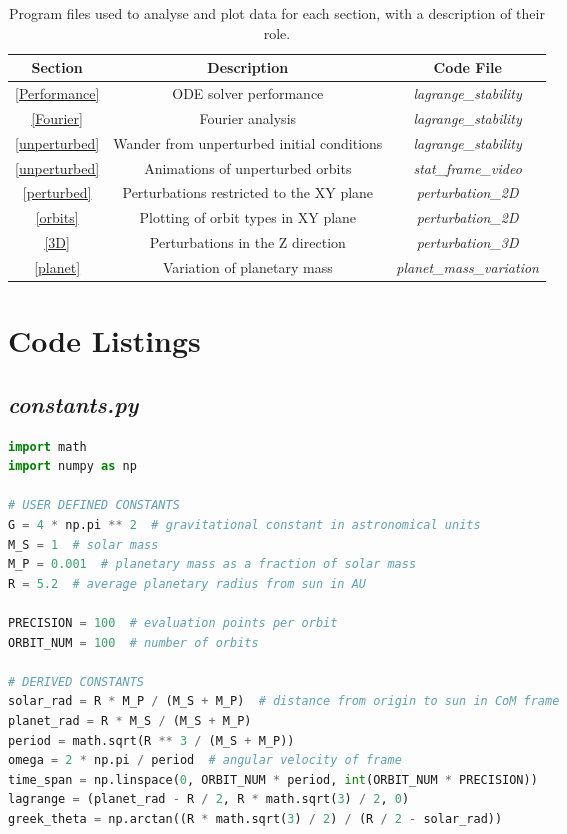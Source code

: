 \documentclass[11pt, a4paper,twocolumn]{article} %
\begin{document}
\begin{appendices}
\begin{table}[ht!]
	\caption{Program files used to analyse and plot data for each section, with a description of their role.}
	\centering
	\begin{tabular}{|c|c|c|}
		\hline
		\textbf{Section} & \textbf{Description} & \textbf{Code File} \\
		\hline \hline
		\ref{Performance} & ODE solver performance & \textit{lagrange\_stability} \\
		\hline
		\ref{Fourier} & Fourier analysis & \textit{lagrange\_stability} \\
		\hline
		\ref{unperturbed} & Wander from unperturbed initial conditions & \textit{lagrange\_stability} \\
		\hline
		\ref{unperturbed} & Animations of unperturbed orbits & \textit{stat\_frame\_video} \\
		\hline
		\ref{perturbed}& Perturbations restricted to the XY plane & \textit{perturbation\_2D} \\
		\hline
		\ref{orbits}& Plotting of orbit types in XY plane & \textit{perturbation\_2D} \\
		\hline
		\ref{3D}& Perturbations in the Z direction & \textit{perturbation\_3D} \\
		\hline
		\ref{planet}& Variation of planetary mass & \textit{planet\_mass\_variation} \\
		\hline
	\end{tabular}
	\label{Codefiles}
\end{table}

\section{Code Listings} \label{Code}
\subsection{\textit{constants.py}}
\begin{lstlisting}[language=Python]
import math
import numpy as np

# USER DEFINED CONSTANTS
G = 4 * np.pi ** 2  # gravitational constant in astronomical units
M_S = 1  # solar mass
M_P = 0.001  # planetary mass as a fraction of solar mass
R = 5.2  # average planetary radius from sun in AU

PRECISION = 100  # evaluation points per orbit
ORBIT_NUM = 100  # number of orbits

# DERIVED CONSTANTS
solar_rad = R * M_P / (M_S + M_P)  # distance from origin to sun in CoM frame
planet_rad = R * M_S / (M_S + M_P)
period = math.sqrt(R ** 3 / (M_S + M_P))
omega = 2 * np.pi / period  # angular velocity of frame
time_span = np.linspace(0, ORBIT_NUM * period, int(ORBIT_NUM * PRECISION))
lagrange = (planet_rad - R / 2, R * math.sqrt(3) / 2, 0)
greek_theta = np.arctan((R * math.sqrt(3) / 2) / (R / 2 - solar_rad))
\end{lstlisting}


\end{appendices}
\end{document}
